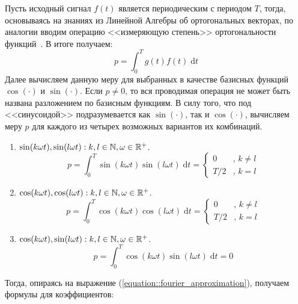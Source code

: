 Пусть исходный сигнал $f(t)$ является периодическим с периодом $T$, тогда, основываясь на знаниях из Линейной Алгебры об ортогональных векторах, по аналогии вводим операцию <<измеряющую степень>> ортогональности функций~\cite{penn2016orthogonal}. В итоге получаем:
\begin{equation}
	p = \int_0^T g(t) f(t) \; \text{d}t
\end{equation}
\indent Далее вычисляем данную меру для выбранных в качестве базисных функций $\cos(\cdot)$ и $\sin(\cdot)$. Если $p \ne 0$, то вся проводимая операция не может быть названа разложением по базисным функциям. В силу того, что под <<синусоидой>> подразумевается как $\sin(\cdot)$, так и $\cos(\cdot)$, вычисляем меру $p$ для каждого из четырех возможных вариантов их комбинаций.
\begin{enumerate}
	\item $\sin(k\omega t), \sin(l \omega t): k, l \in \mathbb{N}, \omega \in \mathbb{R}^+$.
	\begin{equation}
		p = \int_{0}^T \sin(k\omega t)\sin(l \omega t) \; \text{d}t =
		\left\{
		\begin{array}{rl}
			0 & \text{, } k \ne l\\
			T / 2 & \text{, } k = l
		\end{array}
		\right.
	\end{equation}
	
	\item $\cos(k\omega t), \cos(l \omega t): k, l \in \mathbb{N}, \omega \in \mathbb{R}^+$.
	\begin{equation}
		p = \int_{0}^T \cos(k\omega t)\cos(l \omega t) \; \text{d}t =
		\left\{
		\begin{array}{rl}
			0 & \text{, } k \ne l\\
			T / 2 & \text{, } k = l
		\end{array}
		\right.
	\end{equation}
	
	\item $\cos(k\omega t), \sin(l \omega t): k, l \in \mathbb{N}, \omega \in \mathbb{R}^+$.
	\begin{equation}
		p = \int_{0}^T \cos(k\omega t)\sin(l \omega t) \; \text{d}t = 0
	\end{equation}
\end{enumerate}
Тогда, опираясь на  выражение (\ref{equation::fourier_approximation}), получаем формулы для коэффициентов:
